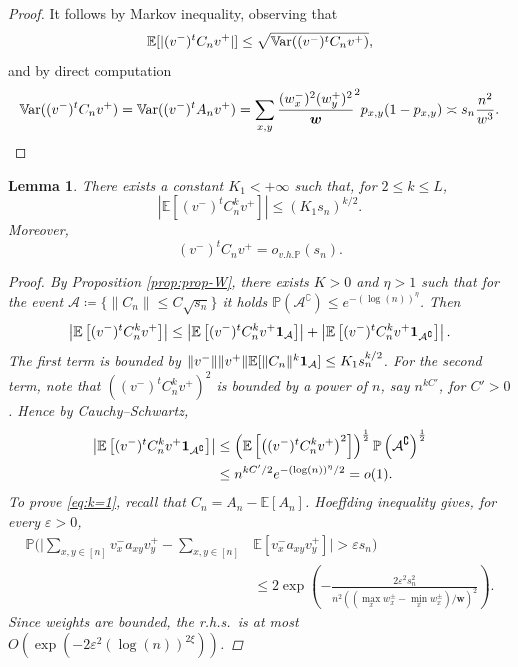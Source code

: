 \documentclass[11pt,oneside]{amsart}
\theoremstyle{plain}
\newtheorem{lemma}[theorem]{Lemma}
\numberwithin{equation}{section}
\newcommand{\rhs}{{r.h.s.~}}
\newcommand{\eps}{\varepsilon}
\newcommand{\E}{\mathbb{E}}
\newcommand{\var}{\mathbb{V}\hspace{-1.pt}{\rm ar}}
\newcommand{\p}{\mathbb{P}}
\newcommand{\one}{\textup{\textbf{1}}}
\newcommand{\centered}{C_n}
\newcommand{\w}{\boldsymbol{w}}
\newcommand{\x}{{{v}}^+}
\newcommand{\y}{{{v}}^-}
\newcommand{\scaling}{s_n}
\newcommand{\ohp}{o_{v.h.\p}}
\begin{document}
\begin{proof}
It follows by Markov  inequality, observing that
    \begin{equation}
        \E[| (\y)^t \centered \x|] \le  \sqrt{\var((\y)^t \centered \x)}, 
    \end{equation}
    and by direct computation 
\begin{equation}
    \var((\y)^t \centered \x)=
    \var((\y)^t A_n \x)=
    \sum_{x,y} \frac{(w_x^-)^2(w_y^+)^2}{\w}^2p_{x,y}(1-p_{x,y}) \asymp \scaling \frac{n^2}{w^3}.  \qedhere
\end{equation}
\end{proof}
\begin{lemma} \label{lem:1}
There exists a constant $K_1<+\infty$ such that, for $2\le k \le L$,
\begin{equation}
    \left|\E \left[(\y)^t\centered^k\x\right]\right| \le \left(K_1 \scaling\right)^{k/2}.
\end{equation}
Moreover, 
\begin{equation} \label{eq:k=1}
(\y)^t \centered \x = \ohp( \scaling).\end{equation}
\begin{proof}
By Proposition \ref{prop:prop-W}, there exists $K>0$ and $\eta>1$ such that for the event $\mathcal{A}\coloneq \{\|\centered\|\le C\sqrt{\scaling}\}$ it holds $\p(\mathcal{A}^\complement)\le e^{-(\log(n))^\eta}$. Then
\begin{equation}
    \left|\E\left[(\y)^t \centered^k \x \right]\right|\le     
    \left|\E\left[(\y)^t \centered^k \x \one_{\mathcal{A}} \right]\right|
    + \left|\E\left[(\y)^t \centered^k \x \one_{\mathcal{A}^\complement} \right]\right|.
\end{equation}
The first term is bounded by  $\|v^-\|\|v^+\|\E[\|\centered\|^k\one_{\mathcal A}] \le K_1\scaling^{{k}/2}$. For the second term, note that $\left((\y)^t \centered^k \x\right)^2$ is bounded by a power of $n$, say $n^{kC'}$, for $C'>0$. Hence by Cauchy--Schwartz,
\begin{align*}
    \left|\E\left[(\y)^t \centered^k \x \one_{\mathcal{A}^\complement} \right]\right|
    &  \le \left(\E\left[\left((\y)^t \centered^k \x\right)^2\right]\right)^{\frac12}\p\left({\mathcal{A}^\complement}\right)^{\frac12} \\
    & \le n^{kC'/2}e^{-(\log(n))^\eta/2}=o(1).
\end{align*}
To prove \eqref{eq:k=1}, recall that $\centered=A_n-\E[A_n]$. Hoeffding  inequality gives,  for every $\eps>0$,
\begin{equation}
\begin{split}
    \p
    \Bigg(\Bigg|\sum_{x,y \in [n]}v_x^- a_{xy} v_y^+-\sum_{x,y \in [n]}&\E\left[v_x^- a_{xy} v_y^+\right]\Bigg|> \eps\scaling\Bigg)\\ &\le 2 \exp \left(-\frac{2\eps^2 \scaling^2}{n^2 ((\max_{x} w_x^\pm-\min_x w_x^\pm)/\w)^2}\right).
    \end{split}
\end{equation}
Since weights are bounded, the \rhs is at most $O(\exp(-2\eps^2(\log(n))^{2\xi}))$.
\end{proof}
\end{lemma}
\end{document}
